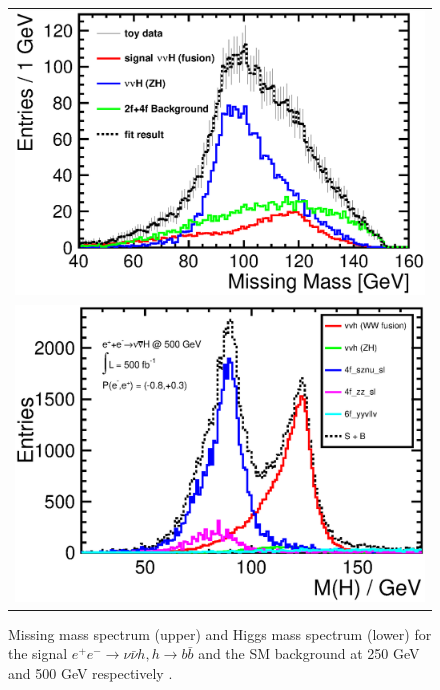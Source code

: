\begin{figure}
\begin{tabular}[c]{c}
\includegraphics[width=0.85\hsize]{chapters/figures/vvH_MissingMass250.eps} \\
\includegraphics[width=0.85\hsize]{chapters/figures/vvH_MassH500.eps}
\end{tabular}
  \caption{Missing mass spectrum (upper) and Higgs mass spectrum (lower) 
  for the signal $e^+e^-\to\nu\bar\nu h, h\to b \bar{b}$ and the SM background 
  at 250 GeV and 500 GeV respectively \cite{Durig:2014lfa,Tian:2017}.}
  \label{fig:vvHbb}
\end{figure}

